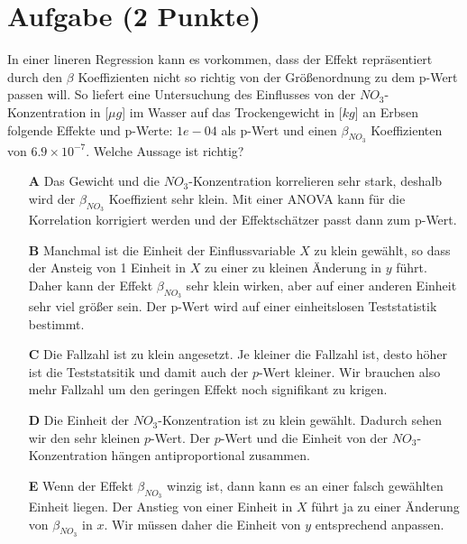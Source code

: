 \documentclass[a4paper, 9pt]{scrartcl}\usepackage[]{graphicx}\usepackage[]{xcolor}
\begin{document}
\section{Aufgabe \hfill (2 Punkte)}

\ifcollection
\begin{flushright}
\tiny\vspace{-2Ex}
\textbf{\examinhaltstart}
\exammodulebiostat
\vspace{-1Ex}
\end{flushright}
\fi




In einer lineren Regression kann es vorkommen, dass der Effekt repräsentiert durch den $\beta$ Koeffizienten nicht so richtig von der Größenordnung zu dem p-Wert passen will. So liefert eine Untersuchung des Einflusses von der $NO_3$-Konzentration in [$\mu g$] im Wasser auf das Trockengewicht in [$kg$] an Erbsen folgende Effekte und p-Werte: $1e-04$ als p-Wert und einen $\beta_{NO_3}$ Koeffizienten von $6.9\times 10^{-7}$. Welche Aussage ist richtig?




\begin{enumerate}
\item [\textbf{A} \msquare] Das Gewicht und die $NO_3$-Konzentration korrelieren sehr stark, deshalb wird der $\beta_{NO_3}$ Koeffizient sehr klein. Mit einer ANOVA kann für die Korrelation korrigiert werden und der Effektschätzer passt dann zum p-Wert.
\item [\textbf{B} \msquare] Manchmal ist die Einheit der Einflussvariable $X$ zu klein gewählt, so dass der Ansteig von 1 Einheit in $X$ zu einer zu kleinen Änderung in $y$ führt. Daher kann der Effekt $\beta_{NO_3}$ sehr klein wirken, aber auf einer anderen Einheit sehr viel größer sein. Der p-Wert wird auf einer einheitslosen Teststatistik bestimmt.
\item [\textbf{C} \msquare] Die Fallzahl ist zu klein angesetzt. Je kleiner die Fallzahl ist, desto höher ist die Teststatsitik und damit auch der $p$-Wert kleiner. Wir brauchen also mehr Fallzahl um den geringen Effekt noch signifikant zu krigen.
\item [\textbf{D} \msquare] Die Einheit der $NO_3$-Konzentration ist zu klein gewählt. Dadurch sehen wir den sehr kleinen $p$-Wert. Der $p$-Wert und die Einheit von der $NO_3$-Konzentration hängen antiproportional zusammen.
\item [\textbf{E} \msquare] Wenn der Effekt $\beta_{NO_3}$ winzig ist, dann kann es an einer falsch gewählten Einheit liegen. Der Anstieg von einer Einheit in $X$ führt ja zu einer Änderung von $\beta_{NO_3}$ in $x$. Wir müssen daher die Einheit von $y$ entsprechend anpassen.
\end{enumerate}
\end{document}
